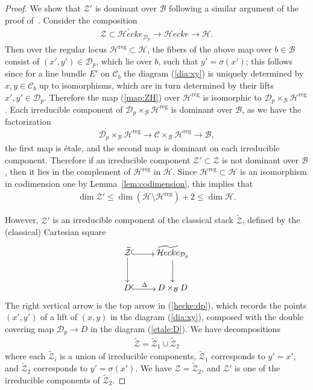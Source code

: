 \documentclass[11pt,oneside,a4paper,mathscr]{amsart}
\makeatletter
\theoremstyle{definition}
\renewcommand{\leq}{\leqslant}
\newcommand{\cH}{\mathcal{H}}
\newcommand{\cB}{\mathcal{B}}
\newcommand{\cC}{\mathcal{C}}
\newcommand{\cD}{\mathcal{D}}
\newcommand{\cHecke}{\mathcal{H}ecke}
\newcommand{\inclusion}{\ar@<-0.3ex>@{^{(}->}[r]}
\makeatother
\begin{document}
\begin{proof}
We show that $\mathcal{Z}'$ is dominant over $\cB$
following a similar argument of the proof of~\cite[Lemma~5.5]{TodaGL2}.
Consider the composition 
\begin{align}\label{map:ZH}
    \mathcal{Z} \subset \widetilde{\cHecke}_{\cD_p} \to \cHecke \to \cH. 
\end{align}
Then over the regular locus $\cH^{\mathrm{reg}} \subset \cH$, the fibers 
of the above map over $b\in \cB$ consist of $(x', y') \in \cD_p$, which lie over $b$, such that $y'=\sigma(x')$;
this follows since for a line bundle $E'$ on $\cC_b$ the diagram (\ref{dia:xy}) 
is uniquely determined by $x, y \in \cC_b$ up to isomorphisms, which 
are in turn determined by their lifts $x', y' \in \cD_p$. 
Therefore the map (\ref{map:ZH}) over $\cH^{\mathrm{reg}}$ is isomorphic to 
$\cD_p \times_{\cB}\cH^{\mathrm{reg}}$. 
Each irreducible component of $\cD_p \times_{\cB}\cH^{\mathrm{reg}}$
is dominant over $\cB$, as we have the factorization 
\begin{align*}
    \cD_p \times_{\cB}\cH^{\mathrm{reg}} \to \cC \times_{\cB}\cH^{\mathrm{reg}} \to \cB,
\end{align*}
the first map is \'etale, and the second map is dominant 
on each irreducible component. 
Therefore if an irreducible component $\mathcal{Z}' \subset \mathcal{Z}$ 
is not dominant over $\cB$, then it lies in the complement of $\cH^{\mathrm{reg}}$ in $\cH$. Since $\cH^{\mathrm{reg}} \subset \cH$ 
is an isomorphism in codimension one by Lemma~\ref{lem:codimension}, 
this implies that 
\begin{align}\label{codim:Z}
    \dim \mathcal{Z}' \leq \dim (\cH \setminus \cH^{\mathrm{reg}})+2 \leq \dim \cH.
\end{align}

However, $\mathcal{Z}'$ is an irreducible component of the classical 
stack $\widetilde{\mathcal{Z}}$, defined by the (classical) Cartesian square 
\begin{align*}
\xymatrix{
    \widetilde{\mathcal{Z}} \inclusion \ar[d] & \widetilde{\cHecke}_{\mathcal{D}_p} \ar[d] \\
    D \inclusion^-{\Delta} & D\times_{\cB} D
    }
\end{align*}
The right vertical arrow is the top arrow in (\ref{hecke:dp}), which 
records the points $(x', y')$ of a lift of $(x, y)$ in the diagram (\ref{dia:xy}), composed with the double covering map $\cD_p \to D$ in the diagram (\ref{etale:D}). 
We have decompositions 
\begin{align*}
    \widetilde{\mathcal{Z}}=\widetilde{\mathcal{Z}}_1 \cup \widetilde{\mathcal{Z}}_2
\end{align*}
where each $\widetilde{\mathcal{Z}}_i$ is a union of irreducible components, 
 $\widetilde{\mathcal{Z}}_1$ corresponds to $y'=x'$, 
and $\widetilde{\mathcal{Z}}_2$ corresponds to $y'=\sigma(x')$. 
We have $\mathcal{Z}=\widetilde{\mathcal{Z}}_2$, and $\mathcal{Z}'$ is one of the irreducible components of $\widetilde{\mathcal{Z}}_2$. 


\end{proof}
\end{document}
